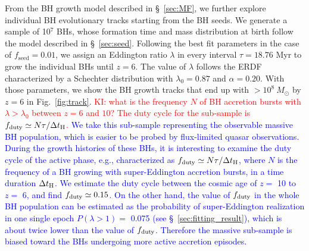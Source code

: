 \documentclass[twocolumn, twocolappendix]{aastex63}
\newcommand{\Msun}{M_\odot}
\newcommand{\tlife}{\tau}
\newcommand{\fseed}{f_\mathrm{seed}}
\newcommand{\red}[1]{\textcolor{red}{ #1}}
\newcommand{\blue}[1]{\textcolor{blue}{ #1}}
\begin{document}
\begin{CJK*}{UTF8}{gbsn}
From the BH growth model described in \S~\ref{sec:MF}, we further explore individual BH evolutionary tracks starting from the BH seeds.
We generate a sample of 10$^7$ BHs, whose formation time and mass distribution at birth follow the model described in \S~\ref{sec:seed}. 
Following the best fit parameters in the case of $\fseed = 0.01$,
we assign an Eddington ratio $\lambda$ in every interval $\tlife=18.76$ Myr to grow the individual BHs until $z=6$. 
The value of $\lambda$ follows the ERDF characterized by a Schechter distribution with $\lambda_0=0.87$ and $\alpha=0.20$.
With those parameters, we show the BH growth tracks that end up with $>10^8~\Msun$ by $z=6$ in Fig.~\ref{fig:track}. 
\red{KI: what is the frequency $N$ of BH accretion bursts with $\lambda>\lambda_0$ between $z=6$ and $10$? The duty cycle for the sub-sample
is $f_{\rm duty}\simeq N\tlife/\Delta t_{\rm H}$.}
\blue{
We take this sub-sample representing the observable massive BH population,
which is easier to be probed by flux-limited quasar observations.
During the growth histories of these BHs, it is interesting to examine the duty cycle of the active phase, 
e.g., characterized as $f_{\rm duty}\simeq N\tlife/\Delta t_{\rm H}$,
where $N$ is the frequency of a BH growing with super-Eddington accretion bursts,
in a time duration $\Delta t_{\rm H}$.
We estimate the duty cycle between the cosmic age of $z=$ 10 to $z=$ 6,
and find $f_{\rm duty}\simeq 0.15$.
On the other hand, the value of $f_{\rm duty}$ in the whole BH population 
can be estimated as the probability of super-Eddington realization in one single epoch 
$P(\lambda>1)=$ 0.075 (see \S~\ref{sec:fitting_result}), 
which is about twice lower than the value of $f_{\rm duty}$.
Therefore the massive sub-sample is biased toward the BHs undergoing more active accretion episodes.
}


\end{CJK*}
\end{document}
